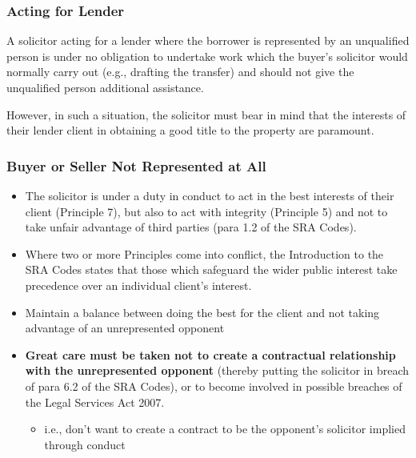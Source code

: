 \documentclass[
]{article}
\providecommand{\tightlist}{%
  \setlength{\itemsep}{0pt}\setlength{\parskip}{0pt}}
\begin{document}
\hypertarget{acting-for-lender}{%
\subsubsection{Acting for Lender}\label{acting-for-lender}}

A solicitor acting for a lender where the borrower is represented by an
unqualified person is under no obligation to undertake work which the
buyer's solicitor would normally carry out (e.g., drafting the transfer)
and should not give the unqualified person additional assistance.

However, in such a situation, the solicitor must bear in mind that the
interests of their lender client in obtaining a good title to the
property are paramount.

\hypertarget{buyer-or-seller-not-represented-at-all}{%
\subsubsection{Buyer or Seller Not Represented at
All}\label{buyer-or-seller-not-represented-at-all}}

\begin{itemize}
\tightlist
\item
  The solicitor is under a duty in conduct to act in the best interests
  of their client (Principle 7), but also to act with integrity
  (Principle 5) and not to take unfair advantage of third parties (para
  1.2 of the SRA Codes).
\item
  Where two or more Principles come into conflict, the Introduction to
  the SRA Codes states that those which safeguard the wider public
  interest take precedence over an individual client's interest.
\item
  Maintain a balance between doing the best for the client and not
  taking advantage of an unrepresented opponent
\item
  \textbf{Great care must be taken not to create a contractual
  relationship with the unrepresented opponent} (thereby putting the
  solicitor in breach of para 6.2 of the SRA Codes), or to become
  involved in possible breaches of the Legal Services Act 2007.

  \begin{itemize}
  \tightlist
  \item
    i.e., don't want to create a contract to be the opponent's solicitor
    implied through conduct
  \end{itemize}
\end{itemize}
\end{document}
